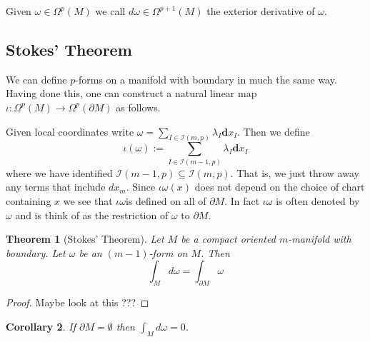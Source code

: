 \documentclass[11pt]{article}
\newcommand{\defeq}{:=}
\newcommand{\mv}[1]{\textbf{#1}}
\newenvironment{defin}
	{\begin{mdframed}[backgroundcolor=white, roundcorner=5pt, linewidth=1pt, linecolor=RoyalBlue]
		\setlength{\parindent}{0pt}}
	{\end{mdframed}}
\newcommand{\mdf}[1]{{\color{RoyalBlue} #1}}
\newtheorem{theorem}{Theorem}[section]
\newtheorem{cor}[theorem]{Corollary}
\begin{document}
\begin{defin}
	Given $\omega\in\Omega^p(M)$ we call $d\omega\in\Omega^{p+1}(M)$ the \mdf{exterior derivative of $\omega$}.	
\end{defin}

\subsection{Stokes' Theorem}
We can define $p$-forms on a manifold with boundary in much the same way.
Having done this, one can construct a natural linear map $\iota : \Omega^p(M) \to \Omega^p(\partial M)$ as follows.

Given local coordinates write $\omega=\sum_{I\in\mathcal{I}(m, p)}\lambda_I\mv{d}x_I$.
Then we define
\[
	\iota(\omega) \defeq \sum_{I\in\mathcal{I}(m-1, p)} \lambda_I \mv{d}x_I
\]
where we have identified $\mathcal{I}(m-1, p)\subseteq \mathcal{I}(m, p)$.
That is, we just throw away any terms that include $dx_m$.
Since $\iota\omega(x)$ does not depend on the choice of chart containing $x$ we see that $\iota\omega$is defined on all of $\partial M$.
In fact $\iota\omega$ is often denoted by $\omega$ and is think of as the restriction of $\omega$ to $\partial M$.

\begin{theorem}[Stokes' Theorem]
Let $M$ be a compact oriented $m$-manifold with boundary.
Let $\omega$ be an $(m-1)$-form on $M$.
Then
\[
	\int_M d\omega = \int_{\partial M}\omega
\]
\end{theorem}

\begin{proof}
Maybe look at this ???
\end{proof}

\begin{cor}
If $\partial M = \emptyset$ then $\int_M d\omega =0$.
\end{cor}
\end{document}

